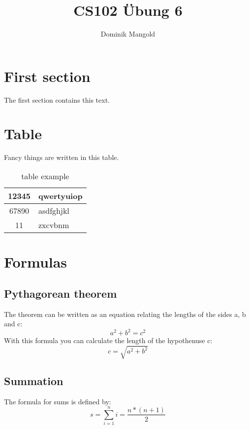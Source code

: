 \documentclass{article}
\begin{document}
\title{CS102 \"Ubung 6}
\author{Dominik Mangold}
\maketitle
\section{First section}
The first section contains this text.
\section{Table}
Fancy things are written in this table.
\begin{table}[h!]
\begin{center}
\begin{tabular}{|c|l|}\hline
12345 & qwertyuiop\\\hline
67890 & asdfghjkl\\\hline
11 & zxcvbnm\\\hline
\end{tabular}
\caption{table example}
\end{center}
\end{table}
\section{Formulas}
\subsection{Pythagorean theorem}
The theorem can be written as an equation relating the lengths of the sides a, b and c:  \[ a^2 + b^2 = c^2 \]
With this formula you can calculate the length of the hypothenuse c: \[c = \sqrt{a^2 + b^2}\]
\subsection{Summation}
The formula for sums is defined by: \[s = \sum_{i = 1}^n i = \frac{n * (n + 1)}{2}\]
\end{document}
